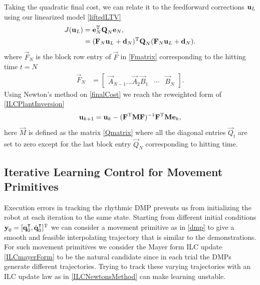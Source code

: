 Taking the quadratic final cost, we can relate it to the feedforward corrections $\boldsymbol{\mathrm{u}}_L$ using our linearized model \eqref{liftedLTV}
%
\begin{equation}
\begin{aligned}
J(\boldsymbol{\mathrm{u}}_L) &= \boldsymbol{\mathrm{e}}_{N}^{\mathrm{T}}\boldsymbol{\mathrm{Q}}_{N}\boldsymbol{\mathrm{e}}_{N}, \\
&= (\boldsymbol{\mathrm{F}}_N\boldsymbol{\mathrm{u}}_L + \boldsymbol{\mathrm{d}}_N)^{\mathrm{T}}\boldsymbol{\mathrm{Q}}_{N}(\boldsymbol{\mathrm{F}}_N\boldsymbol{\mathrm{u}}_L + \boldsymbol{\mathrm{d}}_N).
\end{aligned}
\label{finalCost}
\end{equation}
%
\noindent where $\vec{F}_N$ is the block row entry of $\vec{F}$ in \eqref{Fmatrix} corresponding to the hitting time $t = N$
%
\begin{equation*}
\begin{aligned}
 \vec{F}_N &= 
 \begin{bmatrix}
  \vec{A}_{N-1} \ldots \vec{A}_2 \vec{B}_1 & \cdots & \vec{B}_N 
 \end{bmatrix}.
\end{aligned}
\end{equation*}
%
\noindent Using Newton's method on \eqref{finalCost} we reach the reweighted form of \eqref{ILCPlantInversion}
%
\begin{equation}
\begin{aligned}
\boldsymbol{\mathrm{u}}_{k+1} &= \boldsymbol{\mathrm{u}}_k - (\boldsymbol{\mathrm{F}}^{\mathrm{T}}\boldsymbol{\mathrm{M}}\boldsymbol{\mathrm{F}})^{-1}\boldsymbol{\mathrm{F}}^{\mathrm{T}}\boldsymbol{\mathrm{M}}\boldsymbol{\mathrm{e}}_k,\\
\end{aligned}
\label{ILCmayerForm}
\end{equation}
%
\noindent here $\vec{M}$ is defined as the matrix \eqref{Qmatrix} where all the diagonal entries $\vec{Q}_{t}$ are set to zero except for the last block entry $\vec{Q}_{N}$ corresponding to hitting time.


\subsection{Iterative Learning Control for Movement Primitives}\label{ilcOnDMP} 

Execution errors in tracking the rhythmic DMP prevents us from initializing the robot at each iteration to the same state. Starting from different initial conditions $\boldsymbol{\mathrm{y}}_0 = [\boldsymbol{\mathrm{q}}^{\intercal}_0,\dot{\boldsymbol{\mathrm{q}}}^{\intercal}_0]^{\mathrm{T}}$ we can consider a movement primitive as in \eqref{dmp} to give a smooth and feasible interpolating trajectory that is similar to the demonstrations.
For such movement primitives we consider the Mayer form ILC update \eqref{ILCmayerForm} to be the natural candidate since in each trial the DMPs generate different trajectories. Trying to track these varying trajectories with an ILC update law as in \eqref{ILCNewtonsMethod} can make learning unstable.

